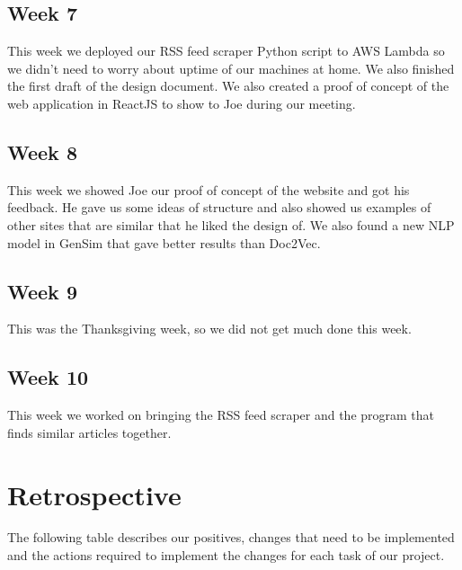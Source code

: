 \documentclass[onecolumn, draftclsnofoot,10pt, compsoc]{IEEEtran}
\begin{document}
\subsection{Week 7}
This week we deployed our RSS feed scraper Python script to AWS Lambda so we didn't need to worry about uptime of our machines at home. We also finished the first draft of the design document. We also created a proof of concept of the web application in ReactJS to show to Joe during our meeting.
\subsection{Week 8}
This week we showed Joe our proof of concept of the website and got his feedback. He gave us some ideas of structure and also showed us examples of other sites that are similar that he liked the design of. We also found a new NLP model in GenSim that gave better results than Doc2Vec.
\subsection{Week 9}
This was the Thanksgiving week, so we did not get much done this week.
\subsection{Week 10}
This week we worked on bringing the RSS feed scraper and the program that finds similar articles together.
\section{Retrospective}
The following table describes our positives, changes that need to be implemented and the actions required to implement the changes for each task of our project.
\end{document}
